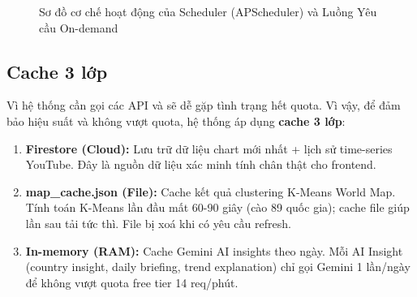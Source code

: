 \documentclass[12pt,a4paper]{report}
\begin{document}
\begin{figure}[H]
{
    }
    \caption{Sơ đồ cơ chế hoạt động của Scheduler (APScheduler) và Luồng Yêu cầu On-demand}
    \label{fig:scheduler_flow}
\end{figure}


\subsection{Cache 3 lớp}
Vì hệ thống cần gọi các API và sẽ dễ gặp tình trạng hết quota. Vì vậy, để đảm bảo hiệu suất và không vượt quota, hệ thống áp dụng \textbf{cache 3 lớp}:
\begin{enumerate}
    \item \textbf{Firestore (Cloud):} Lưu trữ dữ liệu chart mới nhất + lịch sử time-series YouTube. Đây là nguồn dữ liệu xác minh tính chân thật cho frontend.
    \item \textbf{map\_cache.json (File):} Cache kết quả clustering K-Means World Map. Tính toán K-Means lần đầu mất 60-90 giây (cào 89 quốc gia); cache file giúp lần sau tải tức thì. File bị xoá khi có yêu cầu refresh.
    \item \textbf{In-memory (RAM):} Cache Gemini AI insights theo ngày. Mỗi AI Insight (country insight, daily briefing, trend explanation) chỉ gọi Gemini 1 lần/ngày để không vượt quota free tier 14 req/phút.
\end{enumerate}
\end{document}
